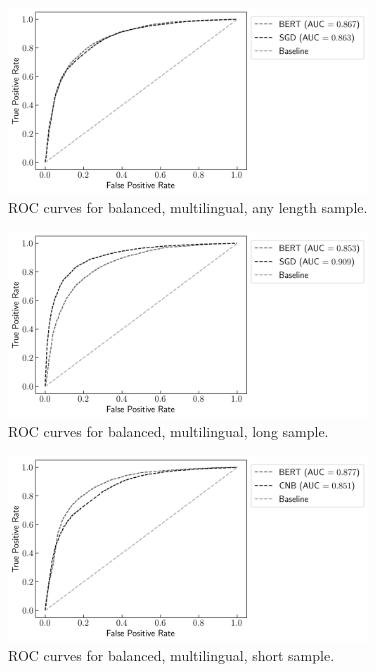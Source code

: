 \begin{figure}[!htb]
    \centering
    \includegraphics[width=0.85\textwidth]{figures/06_results/01_rfp/01_pol/02_roc/any_eq_any.png}
    \caption{ROC curves for balanced, multilingual, any length sample.}
    \label{fig:A1_ROC_BMA}
\end{figure}

\begin{figure}[!htb]
    \centering
    \includegraphics[width=0.85\textwidth]{figures/06_results/01_rfp/01_pol/02_roc/any_eq_long.png}
    \caption{ROC curves for balanced, multilingual, long sample.}
    \label{fig:A1_ROC_BML}
\end{figure}

\begin{figure}[!htb]
    \centering
    \includegraphics[width=0.85\textwidth]{figures/06_results/01_rfp/01_pol/02_roc/any_eq_short.png}
    \caption{ROC curves for balanced, multilingual, short sample.}
    \label{fig:A1_ROC_BMS}
\end{figure}

